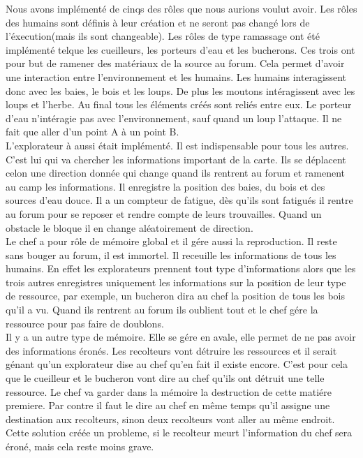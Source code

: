 \documentclass[12pt]{article}
\begin{document}
\begin{itemize}
Nous avons implémenté de cinqs des rôles que nous aurions voulut avoir.
Les rôles des humains sont définis à leur création et ne seront pas changé lors de l'éxecution(mais ils sont changeable).
Les rôles de type ramassage ont été implémenté telque les cueilleurs, les porteurs d'eau et les bucherons.
Ces trois ont pour but de ramener des matériaux de la source au forum. Cela permet d'avoir une interaction entre l'environnement et 
les humains. Les humains interagissent donc avec les baies, le bois et les loups. De plus les moutons intéragissent avec les loups et l'herbe.
Au final tous les éléments créés sont reliés entre eux.
Le porteur d'eau n'intéragie pas avec l'environnement, sauf quand un loup l'attaque. Il ne fait que aller d'un point A à un point B.\\
L'explorateur à aussi était implémenté. Il est indispensable pour tous les autres. C'est lui qui va chercher les informations important de la carte.
Ils se déplacent celon une direction donnée qui change quand ils rentrent au forum et ramenent au camp les informations.
Il enregistre la position des baies, du bois et des sources d'eau douce. Il a un compteur de fatigue, dès qu'ils sont fatigués il rentre au forum
pour se reposer et rendre compte de leurs trouvailles. Quand un obstacle le bloque il en change aléatoirement de direction.\\
Le chef a pour rôle de mémoire global et il gére aussi la reproduction. Il reste sans bouger au forum, il est immortel.
Il receuille les informations de tous les humains. En effet les explorateurs prennent tout type d'informations alors que 
les trois autres enregistres uniquement les informations sur la position de leur type de ressource, par exemple, un bucheron dira au chef la position de tous les
bois qu'il a vu. Quand ils rentrent au forum ils oublient tout et le chef gére la ressource pour pas faire de doublons.\\
Il y a un autre type de mémoire. Elle se gére en avale, elle permet de ne pas avoir des informations éronés.
Les recolteurs vont détruire les ressources et il serait génant qu'un explorateur dise au
chef qu'en fait il existe encore. C'est pour cela que le cueilleur et le bucheron vont dire au chef qu'ils ont détruit une telle ressource.
Le chef va garder dans la mémoire la destruction de cette matiére premiere. Par contre il faut le dire au chef en même temps qu'il assigne
une destination aux recolteurs, sinon deux recolteurs vont aller au même endroit.
Cette solution créée un probleme, si le recolteur meurt l'information du chef sera éroné, mais cela reste moins grave.

\end{itemize}
\end{document}

